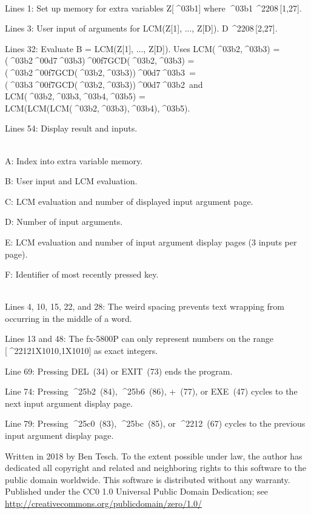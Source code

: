 \documentclass[11pt,letterpaper,twocolumn]{article}
\newcommand{\MUL}{^^^^00d7}
\newcommand{\DIV}{^^^^00f7}
\newcommand{\MINUS}{^^^^2212}
\newcommand{\EXPTEN}{{\scriptsize X10}}
\newcommand{\ELEM}{^^^^2208}
\newcommand{\ALPHA}{^^^^03b1}
\newcommand{\BETA}{^^^^03b2}
\newcommand{\GAMMA}{^^^^03b3}
\newcommand{\DELTA}{^^^^03b4}
\newcommand{\EPSILON}{^^^^03b5}
\newcommand{\UPTRIANG}{^^^^25b2}
\newcommand{\RIGHTTRIANG}{^^^^25b6}
\newcommand{\DOWNTRIANG}{^^^^25bc}
\newcommand{\LEFTTRIANG}{^^^^25c0}
\begin{document}
\\
Lines 1: Set up memory for extra variables Z[\ALPHA] where \ALPHA\,\ELEM \,[1,27].

Lines 3: User input of arguments for LCM(Z[1], ..., Z[D]). D\,\ELEM \,[2,27].

Lines 32: Evaluate B = LCM(Z[1], ..., Z[D]). Uses LCM(\BETA,\GAMMA) = (\BETA\MUL\GAMMA)\DIV GCD(\BETA,\GAMMA) = (\BETA\DIV GCD(\BETA,\GAMMA))\MUL\GAMMA ~= (\GAMMA\DIV GCD(\BETA,\GAMMA))\MUL\BETA ~and LCM(\BETA,\GAMMA,\DELTA,\EPSILON) = LCM(LCM(LCM(\BETA,\GAMMA),\DELTA),\EPSILON).

Lines 54: Display result and inputs.

\\
A: Index into extra variable memory.

B: User input and LCM evaluation.

C: LCM evaluation and number of displayed input argument page.

D: Number of input arguments.

E: LCM evaluation and number of input argument display pages (3 inputs per page).

F: Identifier of most recently pressed key.

\\
Lines 4, 10, 15, 22, and 28: The weird spacing prevents text wrapping from occurring in the middle of a word.

Lines 13 and 48: The fx-5800P can only represent numbers on the range [\MINUS 1\EXPTEN 10,1\EXPTEN 10] as exact integers.

Line 69: Pressing DEL~(34) or EXIT~(73) ends the program.

Line 74: Pressing \UPTRIANG~(84), \RIGHTTRIANG~(86), +~(77), or EXE~(47) cycles to the next input argument display page.

Line 79: Pressing \LEFTTRIANG~(83), \DOWNTRIANG~(85), or \MINUS~(67) cycles to the previous input argument display page.

\vspace{3ex}
\scriptsize{Written in 2018 by Ben Tesch. To the extent possible under law, the author has dedicated all copyright and related and neighboring rights to this software to the public domain worldwide. This software is distributed without any warranty. Published under the CC0 1.0 Universal Public Domain Dedication; see \url{http://creativecommons.org/publicdomain/zero/1.0/}} 
\end{document}
